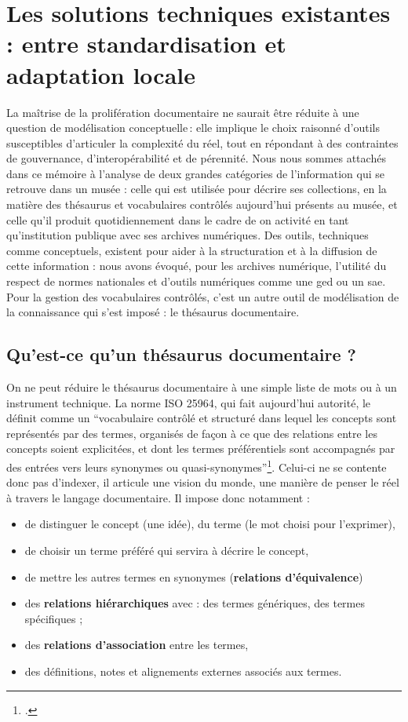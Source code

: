 \section{\label{III-A-2}Les solutions techniques existantes : entre standardisation et adaptation locale}


La maîtrise de la prolifération documentaire ne saurait être réduite à une question de modélisation conceptuelle : elle implique le choix raisonné d’outils susceptibles d’articuler la complexité du réel, tout en répondant à des contraintes de gouvernance, d’interopérabilité et de pérennité. Nous nous sommes attachés dans ce mémoire à l'analyse de deux grandes catégories de l'information qui se retrouve dans un musée : celle qui est utilisée pour décrire ses collections, en la matière des thésaurus et vocabulaires contrôlés aujourd'hui présents au musée, et celle qu'il produit quotidiennement dans le cadre de on activité en tant qu'institution publique avec ses archives numériques. Des outils, techniques comme conceptuels, existent pour aider à la structuration et à la diffusion de cette information : nous avons évoqué, pour les archives numérique, l'utilité du respect de normes nationales et d'outils numériques comme une \gls{ged} ou un \ac{sae}. Pour la gestion des vocabulaires contrôlés, c'est un autre outil de modélisation de la connaissance qui s'est imposé : le thésaurus documentaire.



\subsection{\label{III-A-2.1}Qu’est-ce qu’un thésaurus documentaire ?}

On ne peut réduire le thésaurus documentaire à une simple liste de mots ou à un instrument technique. La norme ISO 25964, qui fait aujourd’hui autorité, le définit comme un \enquote{vocabulaire contrôlé et structuré dans lequel les concepts sont représentés par des termes, organisés de façon à ce que des relations entre les concepts soient explicitées, et dont les termes préférentiels sont accompagnés par des entrées vers leurs synonymes ou quasi-synonymes}\footcite{ISO25964120112011,maroyeISO25964Distinction2015}. Celui-ci ne se contente donc pas d’indexer, il articule une vision du monde, une manière de penser le réel à travers le langage documentaire. Il impose donc notamment :
\begin{itemize}
	\item de distinguer le concept (une idée), du terme (le mot choisi pour l'exprimer),
	\item de choisir un terme préféré qui servira à décrire le concept,
	\item de mettre les autres termes en synonymes (\textbf{relations d'équivalence})
	\item des \textbf{relations hiérarchiques} avec :
		\subitem des termes génériques,
		\subitem des termes spécifiques ;
	\item des \textbf{relations d'association} entre les termes,
	\item des définitions, notes et alignements externes associés aux termes.
\end{itemize}


